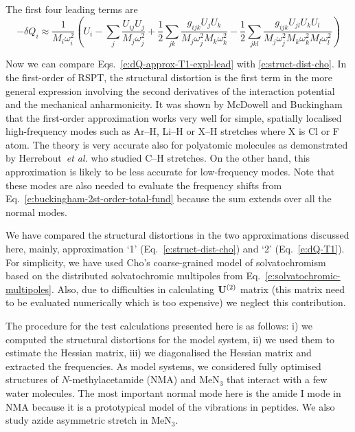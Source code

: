 \documentclass[a4paper,titlepage,twoside,fleqn,12pt]{book}
\begin{document}
\begin{refsection}
\begin{equation}
\end{equation}
%
The first four leading terms are
%
\begin{equation}\label{e:dQ-approx-T1-expl-lead}
-\delta Q_i \approx 
\frac{1}{M_i\omega_i^2}
\left(
    U_i - \sum_j \frac{U_{ij}U_j}{M_j\omega_j^2} + 
    \frac{1}{2} \sum_{jk} \frac{g_{ijk}U_jU_k}{M_j\omega_j^2 M_k\omega_k^2} -
    \frac{1}{2} \sum_{jkl} \frac{g_{ijk}U_{jl}U_kU_l}{M_j\omega_j^2 M_k\omega_k^2 M_l\omega_l^2}
\right)
\end{equation}
%

Now we can compare Eqs.~\eqref{e:dQ-approx-T1-expl-lead} with \eqref{e:struct-dist-cho}.
In the first\hyp{}order of RSPT, the structural distortion is the first term
in the more general expression involving the second 
derivatives of the interaction potential and the mechanical anharmonicity.
It was shown by McDowell and Buckingham that the first\hyp{}order approximation works 
very well for simple, spatially localised high\hyp{}frequency modes such as
Ar--H, Li--H or X--H stretches where X is Cl or F atom. \citep{McDowell.Buckingham.SpectrChimActaA.2005,
McDowell.Buckingham.JACS.2005,McDowell.Buckingham.MolPhys.2005}
The theory is very accurate also for polyatomic molecules
as demonstrated by Herrebout~\emph{et al.} who studied
C--H stretches. \citep{Herrebout.Delanoye.vanderVeken.JPCA.2004}
On the other hand, this
approximation is likely to be less accurate for low\hyp{}frequency modes.
Note that these modes are also needed to evaluate the frequency shifts
from Eq.~\eqref{e:buckingham-2st-order-total-fund} because the sum extends over
all the normal modes.

We have compared the structural distortions in the two approximations
discussed here, mainly, approximation `1' (Eq.~\eqref{e:struct-dist-cho}) and 
`2' (Eq.~\eqref{e:dQ-T1}). For simplicity, we have used Cho's coarse\hyp{}grained
model of solvatochromism based on the distributed solvatochromic multipoles
from Eq.~\eqref{e:solvatochromic-multipoles}. 
Also, due to difficulties in calculating ${\bf U}^{(2)}$ matrix (this matrix need to
be evaluated numerically which is too expensive) we neglect this contribution. 

The procedure for the test calculations presented here is as follows: i) 
we computed the structural distortions for the model system, ii) we used them to estimate
the Hessian matrix, iii) we diagonalised the Hessian matrix and extracted the frequencies.
As model systems, we considered fully optimised structures of $N$-methylacetamide (NMA) 
and MeN$_3$ 
that interact with a few water molecules.
The most important normal mode here is the amide I mode in NMA
because it is a prototypical model of the vibrations in peptides.
We also study azide asymmetric
stretch in MeN$_3$.


\end{refsection}
\end{document}
